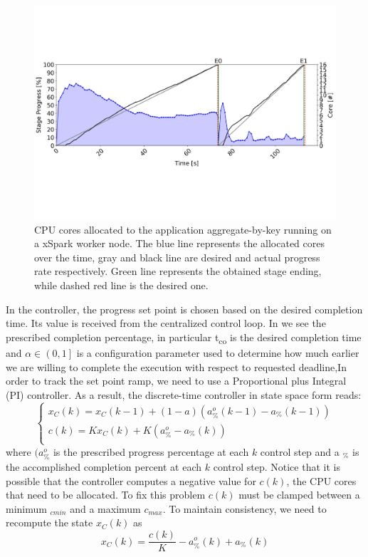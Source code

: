\begin{figure}
	\centering
	\includegraphics[width=\columnwidth]{Images/xspark_chart_agg_by_key.pdf}  
	\caption[xSpark chart aggrregate-by-key.]{CPU cores allocated to the application aggregate-by-key running on a xSpark worker node. The blue line represents the allocated cores over the time, gray and black line are desired and actual progress rate respectively. Green line represents the obtained stage ending, while dashed red line is the desired one.}
	\label{fig:xsparkChartAggByKey}
\end{figure}

In the controller, the progress set point is chosen based on the desired completion time. Its value is received from the centralized control loop. In  we see the prescribed completion percentage, in particular t\textsubscript{co} is the desired completion time and  $\alpha \in \left(0,1\right]$ is a configuration parameter used to determine how much earlier we are willing to complete the execution with respect to requested deadline,In order to track the set point ramp, we need to use a Proportional plus Integral (PI) controller.
As a result, the discrete-time controller in state space form reads:
\[\begin{cases}
x_{C}(k) = x_{C}(k - 1) + (1 - a)(a _{\%}^{o}(k - 1) - a _{\%}(k - 1))\\
c(k) = Kx_{C}(k) + K(a _{\%}^{o} - a _{\%}(k))\\
\end{cases}\]
where $(a _{\%}^{o}$ is the prescribed progress percentage at each $k$ control
step and a $_{\%}$ is the accomplished completion percent at each $k$ control
step. Notice that it is possible that the controller computes a negative value for $c(k)$, the CPU cores that need to be allocated. To fix this problem $c(k)$ must be clamped between a minimum $_{cmin}$ and a maximum $c_{max}$. To maintain consistency, we need to recompute the state $x_{C}(k)$ as 
\[x_{C}(k) = \dfrac{c(k)}{K} - a _{\%}^{o}(k) + a _{\%}(k)\] 

